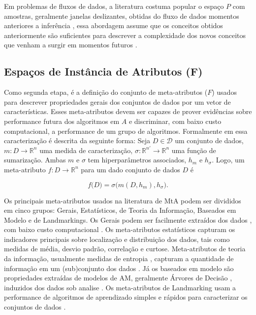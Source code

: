 Em problemas de fluxos de dados, a literatura costuma popular o espaço $P$ com amostras, geralmente janelas deslizantes, obtidas do fluxo de dados momentos anteriores a inferência \cite{Anderson2019,vanrijn2014algorithm}, essa abordagem assume que os conceitos obtidos anteriormente são suficientes para descrever a complexidade dos novos conceitos que venham a surgir em momentos futuros \cite{vanrijn2014algorithm}.



\subsection{Espaços de Instância de Atributos (F)}
Como segunda etapa, é a definição do conjunto de
meta-atributos ($F$) usados para descrever propriedades gerais dos conjuntos de
dados por um vetor de características.
Esses meta-atributos devem ser capazes de prover evidências sobre
performance futura dos algoritmos em $A$ \cite{Soares2001, Reif2012} e
discriminar, com baixo custo computacional, a performance de um grupo de
algoritmos. Formalmente em \cite{Rivolli2018} essa caracterização é descrita da seguinte forma:
Seja $D \in \mathcal{D}$ um conjunto de dados, $m:D\rightarrow\mathbb{R}^n$ uma medida de caracterização, $\sigma:\mathbb{R}^{n'}\rightarrow\mathbb{R}^n$ uma função de sumarização.
Ambas $m$ e $\sigma$ tem hiperparâmetros associados, $h_m$ e $h_\sigma$. Logo, um meta-atributo
$f:D\rightarrow\mathbb{R}^n$ para um dado conjunto de dados $D$ é

\begin{equation}
    f\big(D\big) = \sigma\big(m(D,h_m), h_\sigma\big).
\end{equation}

Os principais meta-atributos usados na literatura de MtA podem ser
divididos em cinco grupos: Gerais, Estatísticos, de Teoria da Informação,
Baseados em Modelo e de Landmarkings. Os Gerais podem ser facilmente extraídos dos dados \cite{Reif2014}, com baixo
custo computacional \cite{Reif2012}.
Os meta-atributos estatísticos capturam os indicadores principais sobre
localização e distribuição dos dados, tais como medidas de média, desvio padrão,
correlação e curtose.
Meta-atributos de teoria da informação, usualmente medidas de entropia
\cite{Segrera2008}, capturam a quantidade de informação em um (sub)conjunto dos
dados \cite{SmithMiles2008}.
Já os baseados em modelo são propriedades extraídas de modelos de AM,
geralmente Árvores de Decisão \cite{Bensusan2000, Peng2002}, induzidos dos dados sob analise
\cite{Reif2014}.
Os meta-atributos de Landmarking usam a performance de algoritmos de
aprendizado simples e rápidos para caracterizar os conjuntos de dados
\cite{SmithMiles2008}.

